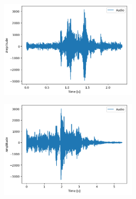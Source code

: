 \documentclass[11pt]{article}
\begin{document}
\begin{figure}
\begin{subfigure}{.5\textwidth}
\begin{subfigure}{.18\textwidth}
  \label{fig:sfig2}
\end{subfigure}
\begin{subfigure}{.18\textwidth}
  \centering
  \includegraphics[width=\linewidth]{Bilder/seminat_happy.png}
  \label{fig:sfig2}
\end{subfigure}
\begin{subfigure}{.18\textwidth}
  \centering
  \includegraphics[width=\linewidth]{Bilder/seminat_sad.png}
  \label{fig:sfig2}
\end{subfigure}
\begin{subfigure}{.18\textwidth}
  \centering

\end{subfigure}
\end{subfigure}
\end{figure}
\end{document}
